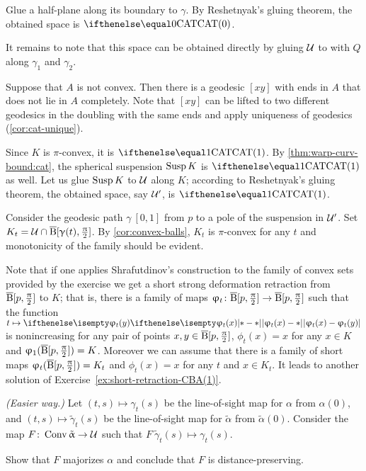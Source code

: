 Glue a half-plane along its boundary to $\gamma$.
By Reshetnyak's gluing theorem, the obtained space is $\CAT0$.

It remains to note that this space can be obtained directly by gluing $\mathcal{U}$ to with $Q$ along $\gamma_1$ and $\gamma_2$.

Suppose that $A$ is not convex.
Then there is a geodesic $[xy]$ with ends in $A$ that does not lie in $A$ completely.
Note that $[xy]$ can be lifted to two different geodesics in the doubling with the same ends and apply uniqueness of geodesics (\ref{cor:cat-unique}).

Since $K$ is $\pi$-convex, it is $\CAT1$.
By \ref{thm:warp-curv-bound:cat}, the spherical suspension $\mathop{\rm Susp}\nolimits K$ is $\CAT1$ as well.
Let us glue $\mathop{\rm Susp}\nolimits K$ to $\mathcal{U}$  along $K$;
according to Reshetnyak's gluing theorem, the obtained space, say $\mathcal{U}'$, is $\CAT1$.

Consider the geodesic path $\gamma\:[0,1]$ from $p$ to a pole of the suspension in $\mathcal{U}'$.
Set $K_t=\spc{U}\cap\cBall[\gamma(t),\tfrac\pi2]$.
By \ref{cor:convex-balls}, $K_t$ is $\pi$-convex for any $t$ and monotonicity of the family should be evident.

Note that if one applies Shrafutdinov's construction to the family of convex sets provided by the exercise we get a short strong deformation retraction from $\overline{\mathrm{B}}{}[p,\tfrac{\uppi}2]$ to $K$;
that is, there is a family of maps $\phi_t\:\cBall[p,\tfrac\pi2]\to \cBall[p,\tfrac\pi2]$ such that 
the function $t\mapsto \dist{\phi_t(x)}{\phi_t(y)}{}$ is nonincreasing for any pair of points $x,y\in\cBall[p,\tfrac\pi2]$, $\phi_t(x)=x$ for any $x\in K$ and $\upvarphi_1(\overline{\mathrm{B}}{}[p,\tfrac{\uppi}2])=K$. 
Moreover we can assume that there is a family of short maps $\upvarphi_t(\overline{\mathrm{B}}{}[p,\tfrac{\uppi}2])= K_t$ and $\phi_t(x)=x$ for any $t$ and $x\in K_t$.
It leads to another solution of Exercise~\ref{ex:short-retraction-CBA(1)}.




\textit{(Easier way.)} 
Let 
$(t,s)\mapsto \gamma_t(s)$ be the line-of-sight map 
for $\alpha$ from $\alpha(0)$,
and 
$(t,s)\mapsto \tilde \gamma_t(s)$ be the line-of-sight map 
for $\tilde \alpha$ from $\tilde \alpha(0)$.
Consider the map  $F\:\Conv\tilde \alpha\to \spc{U}$ such that 
$F\:\tilde \gamma_t(s)\mapsto \gamma_t(s)$.

Show that $F$ majorizes $\alpha$
and conclude that $F$ is distance-preserving.

